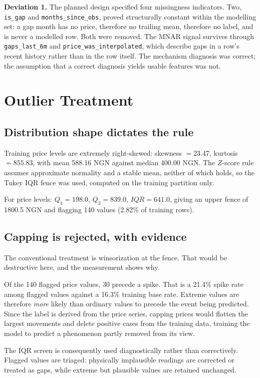 \documentclass[conference]{IEEEtran}
\begin{document}
\textbf{Deviation 1.} The planned design specified four missingness
indicators. Two, \texttt{is\_gap} and \texttt{months\_since\_obs}, proved
structurally constant within the modelling set: a gap month has no price,
therefore no trailing mean, therefore no label, and is never a modelled row.
Both were removed. The MNAR signal survives through \texttt{gaps\_last\_6m}
and \texttt{price\_was\_interpolated}, which describe gaps in a row's recent
history rather than in the row itself. The mechanism diagnosis was correct; the
assumption that a correct diagnosis yields usable features was not.

\section{Outlier Treatment}
\label{sec:outlier}

\subsection{Distribution shape dictates the rule}

Training price levels are extremely right-skewed: skewness $= 23.47$, kurtosis
$= 855.83$, with mean 588.16 NGN against median 400.00 NGN. The $Z$-score rule
assumes approximate normality and a stable mean, neither of which holds, so the
Tukey IQR fence was used, computed on the training partition only.

For price levels: $Q_1 = 198.0$, $Q_3 = 839.0$, $IQR = 641.0$, giving an upper
fence of 1800.5 NGN and flagging 140 values (2.82\% of training rows).

\subsection{Capping is rejected, with evidence}

The conventional treatment is winsorization at the fence. That would be
destructive here, and the measurement shows why.

Of the 140 flagged price values, 30 precede a spike. That is a 21.4\% spike
rate among flagged values against a 16.3\% training base rate. Extreme values
are therefore \emph{more} likely than ordinary values to precede the event
being predicted. Since the label is derived from the price series, capping
prices would flatten the largest movements and delete positive cases from the
training data, training the model to predict a phenomenon partly removed from
its view.

The IQR screen is consequently used diagnostically rather than correctively.
Flagged values are triaged: physically implausible readings are corrected or
treated as gaps, while extreme but plausible values are retained unchanged.
\end{document}
